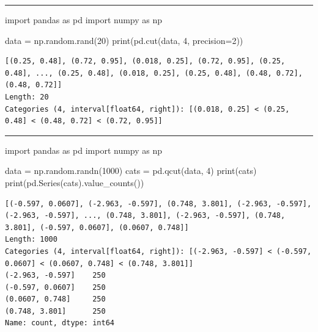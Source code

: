 \documentclass[
  english,
  letterpaper,
  DIV=11,
  numbers=noendperiod]{scrreprt}
\newenvironment{Shaded}{\begin{snugshade}}{\end{snugshade}}
\newcommand{\BuiltInTok}[1]{\textcolor[rgb]{0.00,0.23,0.31}{#1}}
\newcommand{\DecValTok}[1]{\textcolor[rgb]{0.68,0.00,0.00}{#1}}
\newcommand{\ImportTok}[1]{\textcolor[rgb]{0.00,0.46,0.62}{#1}}
\newcommand{\NormalTok}[1]{\textcolor[rgb]{0.00,0.23,0.31}{#1}}
\newcommand{\OperatorTok}[1]{\textcolor[rgb]{0.37,0.37,0.37}{#1}}
\begin{document}
\begin{center}\rule{0.5\linewidth}{0.5pt}\end{center}

\begin{Shaded}
\begin{Highlighting}[]
\ImportTok{import}\NormalTok{ pandas }\ImportTok{as}\NormalTok{ pd}
\ImportTok{import}\NormalTok{ numpy }\ImportTok{as}\NormalTok{ np}

\NormalTok{data }\OperatorTok{=}\NormalTok{ np.random.rand(}\DecValTok{20}\NormalTok{)}
\BuiltInTok{print}\NormalTok{(pd.cut(data, }\DecValTok{4}\NormalTok{, precision}\OperatorTok{=}\DecValTok{2}\NormalTok{))}
\end{Highlighting}
\end{Shaded}

\begin{verbatim}
[(0.25, 0.48], (0.72, 0.95], (0.018, 0.25], (0.72, 0.95], (0.25, 0.48], ..., (0.25, 0.48], (0.018, 0.25], (0.25, 0.48], (0.48, 0.72], (0.48, 0.72]]
Length: 20
Categories (4, interval[float64, right]): [(0.018, 0.25] < (0.25, 0.48] < (0.48, 0.72] < (0.72, 0.95]]
\end{verbatim}

\begin{center}\rule{0.5\linewidth}{0.5pt}\end{center}

\begin{Shaded}
\begin{Highlighting}[]
\ImportTok{import}\NormalTok{ pandas }\ImportTok{as}\NormalTok{ pd}
\ImportTok{import}\NormalTok{ numpy }\ImportTok{as}\NormalTok{ np}

\NormalTok{data }\OperatorTok{=}\NormalTok{ np.random.randn(}\DecValTok{1000}\NormalTok{)}
\NormalTok{cats }\OperatorTok{=}\NormalTok{ pd.qcut(data, }\DecValTok{4}\NormalTok{)}
\BuiltInTok{print}\NormalTok{(cats)}
\BuiltInTok{print}\NormalTok{(pd.Series(cats).value\_counts())}
\end{Highlighting}
\end{Shaded}

\begin{verbatim}
[(-0.597, 0.0607], (-2.963, -0.597], (0.748, 3.801], (-2.963, -0.597], (-2.963, -0.597], ..., (0.748, 3.801], (-2.963, -0.597], (0.748, 3.801], (-0.597, 0.0607], (0.0607, 0.748]]
Length: 1000
Categories (4, interval[float64, right]): [(-2.963, -0.597] < (-0.597, 0.0607] < (0.0607, 0.748] < (0.748, 3.801]]
(-2.963, -0.597]    250
(-0.597, 0.0607]    250
(0.0607, 0.748]     250
(0.748, 3.801]      250
Name: count, dtype: int64
\end{verbatim}
\end{document}
